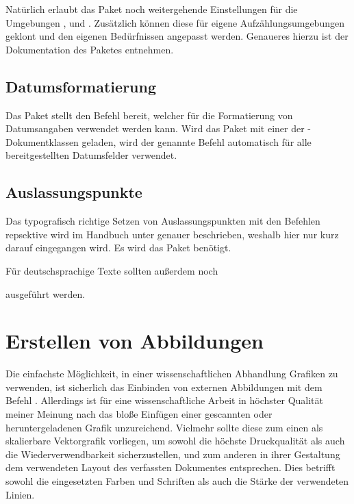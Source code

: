 \documentclass[%
  english,ngerman,%
  cdgeometry=no,DIV=12,automark,%
]{tudscrartcl}
\begin{document}
Natürlich erlaubt das Paket noch weitergehende Einstellungen für die Umgebungen 
,  und . 
Zusätzlich können diese für eigene Aufzählungsumgebungen geklont und den 
eigenen Bedürfnissen angepasst werden. Genaueres hierzu ist der Dokumentation 
des Paketes  entnehmen.


\subsection{Datumsformatierung}
Das Paket  stellt den Befehl  bereit, welcher 
für die Formatierung von Datumsangaben verwendet werden kann. Wird das Paket 
mit einer der \TUDScript-Dokumentklassen geladen, wird der genannte Befehl 
automatisch für alle bereitgestellten Datumsfelder verwendet.
%
\begin{Preamble}
\usepackage{isodate}

\end{Preamble}


\subsection{Auslassungspunkte}
Das typografisch richtige Setzen von Auslassungspunkten mit den Befehlen 
 repsektive  wird im Handbuch unter 
 genauer 
beschrieben, weshalb hier nur kurz darauf eingegangen wird. Es wird das Paket 
 benötigt.
%
\begin{Preamble}
\usepackage{ellipsis}
\end{Preamble}
%
Für deutschsprachige Texte sollten außerdem noch 
%
\begin{Preamble}
\let\ellipsispunctuation\relax

\end{Preamble}
%
ausgeführt werden.



\section{Erstellen von Abbildungen}
\label{sec:figures}
Die einfachste Möglichkeit, in einer wissenschaftlichen Abhandlung Grafiken zu 
verwenden, ist sicherlich das Einbinden von externen Abbildungen mit dem Befehl 
. Allerdings ist für eine wissenschaftliche Arbeit in 
höchster Qualität meiner Meinung nach das bloße Einfügen einer gescannten oder 
heruntergeladenen Grafik unzureichend. Vielmehr sollte diese zum einen als 
skalierbare Vektorgrafik vorliegen, um sowohl die höchste Druckqualität als 
auch die Wiederverwendbarkeit sicherzustellen, und zum anderen in ihrer 
Gestaltung dem verwendeten Layout des verfassten Dokumentes entsprechen. Dies 
betrifft sowohl die eingesetzten Farben und Schriften als auch die Stärke der 
verwendeten Linien.
\end{document}
